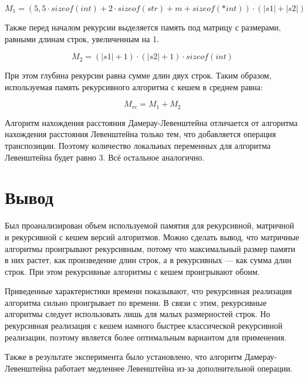 \begin{equation}
	\label{eq:rm}
	M_{1} = (5,5 \cdot sizeof(int)+2 \cdot sizeof(str) + m +sizeof(*int))\cdot(|s1|+|s2|)
\end{equation}

Также перед началом рекурсии выделяется память под матрицу с размерами, равными длинам строк, увеличенным на 1.

\begin{equation}
	\label{eq:rm}
	M_{2} = (|s1|+1) \cdot (|s2|+1) \cdot sizeof(int)
\end{equation}

При этом глубина рекурсии равна сумме длин двух строк. Таким образом, используемая память рекурсивного алгоритма с кешем в среднем равна:

\begin{equation}
	\label{eq:rm}
	M_{rc} = M_{1}+M_{2}
\end{equation}

Алгоритм нахождения расстояния Дамерау-Левенштейна отличается от алгоритма нахождения расстояния Левенштейна только тем, что добавляется операция транспозиции. Поэтому количество локальных переменных для алгоритма Левенштейна будет равно 3. Всё остальное аналогично.

\section{Вывод}
Был проанализирован объем используемой памятия для рекурсивной, матричной и рекурсивной с кешем версий алгоритмов. Можно сделать вывод, что матричные алгоритмы проигрывают рекурсивным, потому что максимальный размер памяти в них растет, как произведение длин строк, а в рекурсивных --- как сумма длин строк. При этом рекурсивные алгоритмы с кешем проигрывают обоим.

Приведенные характеристики времени показывают, что рекурсивная реализация алгоритма сильно проигрывает по времени. В связи с этим, рекурсивные алгоритмы следует использовать лишь для малых размерностей строк. Но рекурсивная реализация с кешем намного быстрее классической рекурсивной реализации, поэтому является более оптимальным вариантом для применения.

Также в результате эксперимента было установлено, что алгоритм Дамерау-Левенштейна работает медленнее Левенштейна из-за дополнительной операции.